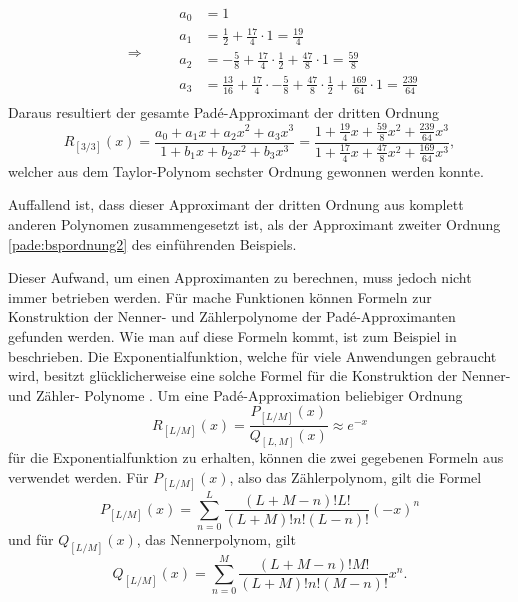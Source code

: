 \begin{beispiel}
\begin{equation}
\qquad\Rightarrow\qquad
\begin{aligned}
a_{0}&=1 \\
a_{1}&=\frac{1}{2}+\frac{17}{4} \cdot 1 = \frac{19}{4}\\
a_{2}&=-\frac{5}{8} +\frac{17}{4}\cdot \frac{1}{2} +\frac{47}{8} \cdot 1 = \frac{59}{8} \\
a_{3}&=\frac{13}{16}+\frac{17}{4}\cdot -\frac{5}{8} + \frac{47}{8}\cdot \frac{1}{2} + \frac{169}{64} \cdot 1 = \frac{239}{64}\\
\end{aligned}
\end{equation}
Daraus resultiert der gesamte Padé-Approximant der dritten Ordnung
\begin{equation}
R_{[3/ 3]}(x)
=
\frac{a_0+a_1x+a_2 x^2+a_3x^3}
{1+b_1x+b_2 x^2+b_3 x^3}
=
\frac{\displaystyle1+\frac{19}{4}x+\frac{59}{8}x^2+\frac{239}{64}x^3}
{\displaystyle1+\frac{17}{4}x+\frac{47}{8}x^2+\frac{169}{64}x^3},
\end{equation}
welcher aus dem Taylor-Polynom sechster Ordnung gewonnen werden konnte.

Auffallend ist, dass dieser Approximant der dritten Ordnung aus komplett
anderen Polynomen zusammengesetzt ist, als der Approximant zweiter Ordnung
\eqref{pade:bspordnung2}
des einführenden Beispiels.
\end{beispiel}

Dieser Aufwand, um einen Approximanten zu berechnen, muss jedoch nicht immer betrieben werden.
Für mache Funktionen können Formeln zur Konstruktion der Nenner- und Zählerpolynome der Padé-Approximanten gefunden werden.
%
Wie man auf diese Formeln kommt, ist zum Beispiel in \cite{pade:Baker2009} beschrieben.
Die Exponentialfunktion, welche für viele Anwendungen gebraucht wird, besitzt glücklicherweise eine solche Formel für die Konstruktion der Nenner- und Zähler- Polynome \cite{pade:moler}.
Um eine  Padé-Approximation beliebiger Ordnung
\begin{equation}
R_{[L/M]}(x)
=
\frac{P_{[L/ M]}(x)}{Q_{[L, M]}(x)} \approx e^{-x}
\end{equation}
für die Exponentialfunktion zu erhalten,
können die zwei gegebenen Formeln aus \cite{pade:moler} verwendet werden.
Für $P_{[L/ M]}(x)$, also das Zählerpolynom, gilt die Formel
\begin{equation}
P_{[L/ M]}(x)
=
\sum_{n=0}^{L} \frac{(L+M-n) ! L !}{(L+M) ! n !(L-n) !}(-x)^{n}
\label{pade:expP}
\end{equation}
und für $Q_{[L/ M]}(x)$, das Nennerpolynom, gilt
\begin{equation}
Q_{[L/ M]}(x)
=
\sum_{n=0}^{M} \frac{(L+M-n) ! M !}{(L+M) ! n !(M-n) !} x^{n}.
\label{pade:expQ}
\end{equation}

